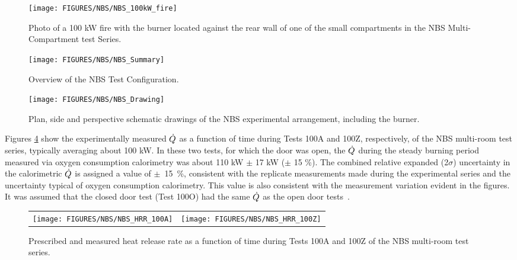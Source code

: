 \begin{figure}
\begin{center}
\texttt{[image: FIGURES/NBS/NBS\_100kW\_fire]}  \\
\end{center}
\caption{Photo of a 100 kW fire with the burner located against the rear wall of one of the small compartments in the NBS Multi-Compartment test Series.}
 \label{fig:NBS_100kW_fire}
\end{figure}

\begin{figure}[\figoptions{t}]
\begin{center}
\texttt{[image: FIGURES/NBS/NBS\_Summary]}\\
\end{center}
\caption{Overview of the NBS Test Configuration.}
 \label{fig:NBS_Summary}
\end{figure}

\begin{figure}[\figoptions{t}]
\begin{center}
\texttt{[image: FIGURES/NBS/NBS\_Drawing]}\\
\end{center}
\caption{Plan, side and perspective schematic drawings of the NBS experimental arrangement, including the burner.}
 \label{fig:NBS_Detailed}
\end{figure}

Figures \ref{fig:NBS_HRR} show the experimentally measured $\dot{Q}$ as a function of time during Tests 100A and 100Z, respectively, of the NBS multi-room test series, typically averaging about 100 kW.  In these two tests, for which the door was open, the $\dot{Q}$ during the steady burning period measured via oxygen consumption calorimetry was about 110 kW $\pm$ 17 kW ($\pm$ 15 \%). The combined relative expanded (2$\sigma$) uncertainty in the calorimetric  $\dot{Q}$ is assigned a value of $\pm$~15~\%, consistent with the replicate measurements made during the experimental series and the uncertainty typical of oxygen consumption calorimetry. This value is also consistent with the measurement variation evident in the figures.  It was assumed that the closed door test (Test 100O) had the same $\dot{Q}$ as the open door tests~\cite{NRCNUREG1824}.

\begin{figure}[\figoptions{t}]
\begin{center}
\begin{tabular}{cc}
\texttt{[image: FIGURES/NBS/NBS\_HRR\_100A]} & \texttt{[image: FIGURES/NBS/NBS\_HRR\_100Z]}\\
\end{tabular}
\end{center}
\caption{Prescribed and measured heat release rate as a function of time during Tests 100A and 100Z of the NBS multi-room test series.}
 \label{fig:NBS_HRR}
\end{figure}


